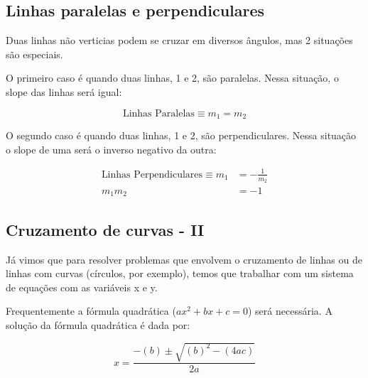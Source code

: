 \documentclass[pdftex, brazil, 12pt, twoside]{article}
\begin{document}
\subsection{Linhas paralelas e perpendiculares}
\label{modelagem-linear-paralelas-perpendiculares}

Duas linhas não verticias podem se cruzar em diversos ângulos, mas 2 situações
são especiais.

O primeiro caso é quando duas linhas, 1 e 2, são paralelas. Nessa situação,
o slope das linhas será igual:

\begin{equation}
  \text{Linhas Paralelas} \equiv m_1 = m_2
\end{equation}

O segundo caso é quando duas linhas, 1 e 2, são perpendiculares. Nessa situação
o slope de uma será o inverso negativo da outra:

\begin{equation}
  \begin{split}
    \text{Linhas Perpendiculares} \equiv m_1 & = -\frac{1}{m_2}\\
                                         m_1m_2 & = -1
  \end{split}
\end{equation}


\subsection{Cruzamento de curvas - II}
\label{modelagem-linear-cruzamento-curvas-ii}

Já vimos que para resolver problemas que envolvem o cruzamento de linhas ou
de linhas com curvas (círculos, por exemplo), temos que trabalhar com um sistema
de equações com as variáveis x e y.

Frequentemente a fórmula quadrática ($ax^2 + bx + c = 0$) será necessária. A
solução da fórmula quadrática é dada por:

\begin{equation}
  x = \frac{-(b) \pm \sqrt{(b)^2 - (4ac)}}{2a}
\end{equation}

\end{document}
